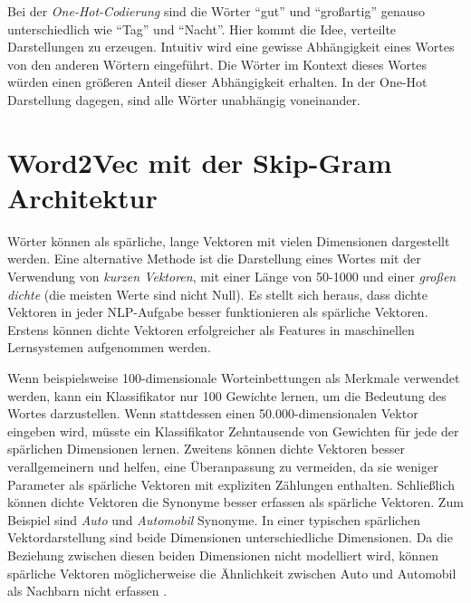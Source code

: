 Bei der \textit{One-Hot-Codierung} sind die Wörter \enquote{gut} und \enquote{großartig}  genauso unterschiedlich wie \enquote{Tag} und \enquote{Nacht}. Hier kommt die Idee, verteilte Darstellungen zu erzeugen. Intuitiv wird eine gewisse Abhängigkeit eines Wortes von den anderen Wörtern eingeführt. Die Wörter im Kontext dieses Wortes würden einen größeren Anteil dieser Abhängigkeit erhalten. In der One-Hot Darstellung dagegen, sind alle Wörter unabhängig voneinander.



\section{Word2Vec mit der Skip-Gram Architektur}

Wörter können als spärliche, lange Vektoren mit vielen Dimensionen dargestellt werden. Eine alternative Methode ist die Darstellung eines Wortes mit der Verwendung von \textit{kurzen Vektoren}, mit einer Länge von 50-1000 und einer \textit{großen dichte} (die meisten Werte sind nicht Null). Es stellt sich heraus, dass dichte Vektoren in jeder NLP-Aufgabe besser funktionieren als spärliche Vektoren. Erstens können dichte Vektoren erfolgreicher als Features in maschinellen Lernsystemen aufgenommen werden.

Wenn beispielsweise 100-dimensionale Worteinbettungen als Merkmale verwendet werden, kann ein Klassifikator nur 100 Gewichte lernen, um die Bedeutung des Wortes darzustellen. Wenn  stattdessen einen 50.000-dimensionalen Vektor eingeben wird, müsste ein Klassifikator Zehntausende von Gewichten für jede der spärlichen Dimensionen lernen. Zweitens können dichte Vektoren besser verallgemeinern und helfen, eine Überanpassung zu vermeiden, da sie weniger Parameter als spärliche Vektoren mit expliziten Zählungen enthalten. Schließlich können dichte Vektoren die Synonyme besser erfassen als spärliche Vektoren. Zum Beispiel sind \textit{Auto} und \textit{Automobil} Synonyme. In einer typischen spärlichen Vektordarstellung sind beide Dimensionen unterschiedliche Dimensionen. Da die Beziehung zwischen diesen beiden Dimensionen nicht modelliert wird, können spärliche Vektoren möglicherweise die Ähnlichkeit zwischen Auto und Automobil als Nachbarn nicht erfassen \cite*[110-111]{Jurafskya}.


